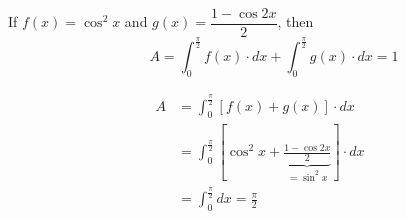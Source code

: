 \documentclass[14pt,fleqn]{extarticle}
\newcommand\intg{\int_0^{\frac\pi{2}}}
\begin{document}
 
\begin{snippet}
    
    \incorrect

    If $f(x)=\cos^2 x$ and $g(x) = \dfrac{1-\cos 2x}{2}$, then 
    \[ \qquad A = \intg f(x) \cdot dx + \intg g(x) \cdot dx = 1 \]
    
    \reason
    
    \begin{align}
	A &= \intg \left[f(x) + g(x) \right]\cdot dx  \\
	&= \intg \left[\cos^2 x + \underbrace{\frac{1-\cos2x}{2}}_{=\sin^2 x} \right]\cdot dx \\
	&= \intg dx = \frac\pi{2} 
\end{align}
    
\end{snippet} 
\end{document}
